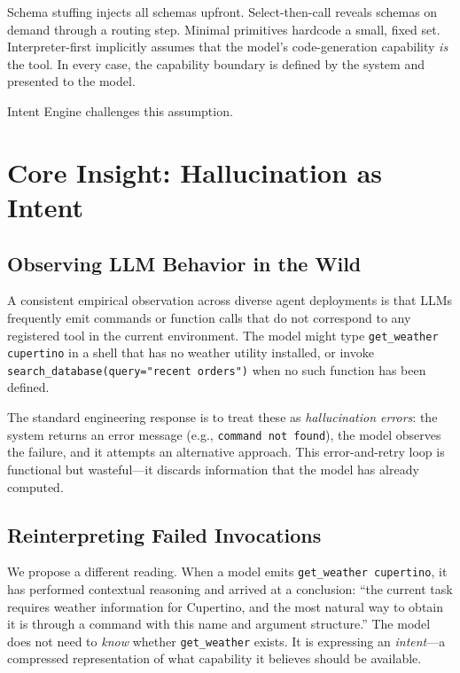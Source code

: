 \documentclass[11pt]{article}
\begin{document}
Schema stuffing injects all schemas upfront.
Select-then-call reveals schemas on demand through a routing step.
Minimal primitives hardcode a small, fixed set.
Interpreter-first implicitly assumes that the model's code-generation capability \emph{is} the tool.
In every case, the capability boundary is defined by the system and presented to the model.

Intent Engine challenges this assumption.

\section{Core Insight: Hallucination as Intent}
\label{sec:insight}

\subsection{Observing LLM Behavior in the Wild}

A consistent empirical observation across diverse agent deployments is that LLMs frequently emit commands or function calls that do not correspond to any registered tool in the current environment.
The model might type \texttt{get\_weather cupertino} in a shell that has no weather utility installed, or invoke \texttt{search\_database(query="recent orders")} when no such function has been defined.

The standard engineering response is to treat these as \emph{hallucination errors}: the system returns an error message (e.g., \texttt{command not found}), the model observes the failure, and it attempts an alternative approach.
This error-and-retry loop is functional but wasteful---it discards information that the model has already computed.

\subsection{Reinterpreting Failed Invocations}

We propose a different reading.
When a model emits \texttt{get\_weather cupertino}, it has performed contextual reasoning and arrived at a conclusion: ``the current task requires weather information for Cupertino, and the most natural way to obtain it is through a command with this name and argument structure.''
The model does not need to \emph{know} whether \texttt{get\_weather} exists.
It is expressing an \emph{intent}---a compressed representation of what capability it believes should be available.
\end{document}
